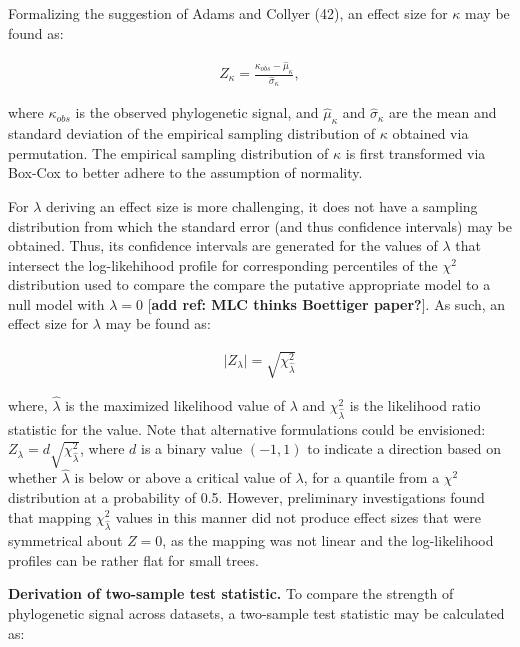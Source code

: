 \documentclass[
]{article}
\begin{document}
Formalizing the suggestion of Adams and Collyer (42), an effect size for
\(\kappa\) may be found as:

\begin{align}
    Z_\kappa=\frac{\kappa_{obs}-\hat\mu_{\kappa}}{\hat\sigma_{\kappa}},
\end{align}

where \(\kappa_{obs}\) is the observed phylogenetic signal, and
\(\hat\mu_\kappa\) and \(\hat\sigma_\kappa\) are the mean and standard
deviation of the empirical sampling distribution of \(\kappa\) obtained
via permutation. The empirical sampling distribution of \(\kappa\) is
first transformed via Box-Cox to better adhere to the assumption of
normality. \hfill\break

For \(\lambda\) deriving an effect size is more challenging, it does not
have a sampling distribution from which the standard error (and thus
confidence intervals) may be obtained. Thus, its confidence intervals
are generated for the values of \(\lambda\) that intersect the
log-likehihood profile for corresponding percentiles of the \(\chi^2\)
distribution used to compare the compare the putative appropriate model
to a null model with \(\lambda = 0\) {[}\textbf{add ref: MLC thinks
Boettiger paper?}{]}. As such, an effect size for \(\lambda\) may be
found as:

\begin{align}
   \lvert Z_{\lambda} \rvert = \sqrt{\chi^2_{\hat{\lambda}}}
\end{align}

where, \(\hat{\lambda}\) is the maximized likelihood value of
\(\lambda\) and \(\chi^{2}_{\hat{\lambda}}\) is the likelihood ratio
statistic for the value. Note that alternative formulations could be
envisioned: \(Z_{\lambda} = d \sqrt{\chi^2_{\hat{\lambda}}}\), where
\(d\) is a binary value \((-1,1)\) to indicate a direction based on
whether \(\hat{\lambda}\) is below or above a critical value of
\(\lambda\), for a quantile from a \(\chi^{2}\) distribution at a
probability of 0.5. However, preliminary investigations found that
mapping \(\chi^2_{\hat{\lambda}}\) values in this manner did not produce
effect sizes that were symmetrical about \(Z = 0\), as the mapping was
not linear and the log-likelihood profiles can be rather flat for small
trees. \hfill\break

\textbf{Derivation of two-sample test statistic.} To compare the
strength of phylogenetic signal across datasets, a two-sample test
statistic may be calculated as:
\end{document}
